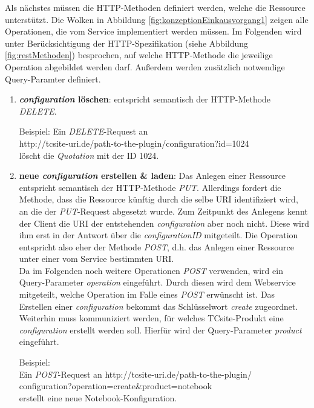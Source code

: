 \documentclass[12pt,a4paper,bibliography=totocnumbered,listof=totoc]{scrartcl}
\begin{document}
Als nächstes müssen die HTTP-Methoden definiert werden, welche die Ressource unterstützt. Die Wolken in Abbildung \ref{fig:konzeptionEinkausvorgang1} zeigen alle Operationen, die vom Service implementiert werden müssen. Im Folgenden wird unter Berücksichtigung der HTTP-Spezifikation (siehe Abbildung \ref{fig:restMethoden}) besprochen, auf welche HTTP-Methode die jeweilige Operation abgebildet werden darf. Außerdem werden zusätzlich notwendige Query-Paramter definiert.

\begin{enumerate}
\item \textbf{\emph{configuration} löschen}: entspricht semantisch der HTTP-Methode \emph{DELETE}. 
\begin{addmargin}[25pt]{0pt} 
Beispiel: Ein \emph{DELETE}-Request an\\
\glqq http://tcsite-uri.de/path-to-the-plugin/configuration?id=1024\grqq{}
\\löscht die \emph{Quotation} mit der ID 1024.
\end{addmargin}
\item \textbf{neue \emph{configuration} erstellen \& laden}: Das Anlegen einer Ressource entspricht semantisch der HTTP-Methode \emph{PUT}. Allerdings fordert die Methode, dass die Ressource künftig durch die selbe URI identifiziert wird, an die der \emph{PUT}-Request abgesetzt wurde. Zum Zeitpunkt des Anlegens kennt der Client die URI der entstehenden \emph{configuration} aber noch nicht. Diese wird ihm erst in der Antwort über die \emph{configurationID} mitgeteilt. Die Operation entspricht also eher der Methode \emph{POST}, d.h. das Anlegen einer Ressource unter einer vom Service bestimmten URI.\\Da im Folgenden noch weitere Operationen \emph{POST} verwenden, wird ein Query-Parameter \emph{operation} eingeführt. Durch diesen wird dem Webservice mitgeteilt, welche Operation im Falle eines \emph{POST} erwünscht ist. Das Erstellen einer \emph{configuration} bekommt das Schlüsselwort \emph{create} zugeordnet. Weiterhin muss kommuniziert werden, für welches TCsite-Produkt eine \emph{configuration} erstellt werden soll. Hierfür wird der Query-Parameter \emph{product} eingeführt.
\begin{addmargin}[25pt]{0pt} 
Beispiel:
\\Ein \emph{POST}-Request an \glqq http://tcsite-uri.de/path-to-the-plugin/
\\configuration?operation=create\&product=notebook\grqq{}\\
erstellt eine neue Notebook-Konfiguration.

\end{addmargin}
\end{enumerate}
\end{document}
